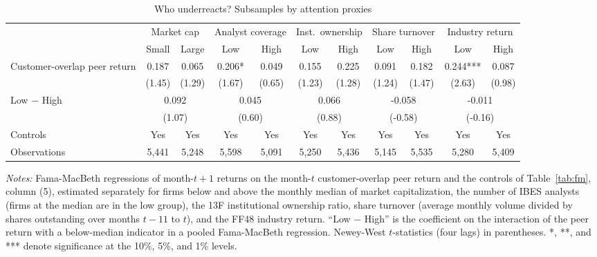 \begin{table}[!htbp]\centering
\caption{Who underreacts? Subsamples by attention proxies}\label{tab:subsamples}
\scriptsize
\begin{tabular*}{\linewidth}{@{\extracolsep{\fill}}lcccccccccc}
\toprule
 & \multicolumn{2}{c}{Market cap} & \multicolumn{2}{c}{Analyst coverage} & \multicolumn{2}{c}{Inst.\ ownership} & \multicolumn{2}{c}{Share turnover} & \multicolumn{2}{c}{Industry return} \\
\cmidrule(lr){2-3}\cmidrule(lr){4-5}\cmidrule(lr){6-7}\cmidrule(lr){8-9}\cmidrule(lr){10-11}
 & Small & Large & Low & High & Low & High & Low & High & Low & High \\
\midrule
Customer-overlap peer return & 0.187 & 0.065 & 0.206* & 0.049 & 0.155 & 0.225 & 0.091 & 0.182 & 0.244*** & 0.087 \\
 & (1.45) & (1.29) & (1.67) & (0.65) & (1.23) & (1.28) & (1.24) & (1.47) & (2.63) & (0.98) \\
\addlinespace
Low $-$ High & \multicolumn{2}{c}{0.092} & \multicolumn{2}{c}{0.045} & \multicolumn{2}{c}{0.066} & \multicolumn{2}{c}{-0.058} & \multicolumn{2}{c}{-0.011} \\
 & \multicolumn{2}{c}{(1.07)} & \multicolumn{2}{c}{(0.60)} & \multicolumn{2}{c}{(0.88)} & \multicolumn{2}{c}{(-0.58)} & \multicolumn{2}{c}{(-0.16)} \\
\addlinespace
Controls & Yes & Yes & Yes & Yes & Yes & Yes & Yes & Yes & Yes & Yes \\
Observations & 5,441 & 5,248 & 5,598 & 5,091 & 5,250 & 5,436 & 5,145 & 5,535 & 5,280 & 5,409 \\
\bottomrule
\end{tabular*}
\par\vspace{4pt}\begin{minipage}{\linewidth}\scriptsize \emph{Notes:} Fama-MacBeth regressions of month-$t+1$ returns on the month-$t$ customer-overlap peer return and the controls of Table~\ref{tab:fm}, column (5), estimated separately for firms below and above the monthly median of market capitalization, the number of IBES analysts (firms at the median are in the low group), the 13F institutional ownership ratio, share turnover (average monthly volume divided by shares outstanding over months $t-11$ to $t$), and the FF48 industry return. ``Low $-$ High'' is the coefficient on the interaction of the peer return with a below-median indicator in a pooled Fama-MacBeth regression. Newey-West $t$-statistics (four lags) in parentheses. *, **, and *** denote significance at the 10\%, 5\%, and 1\% levels.\end{minipage}
\end{table}